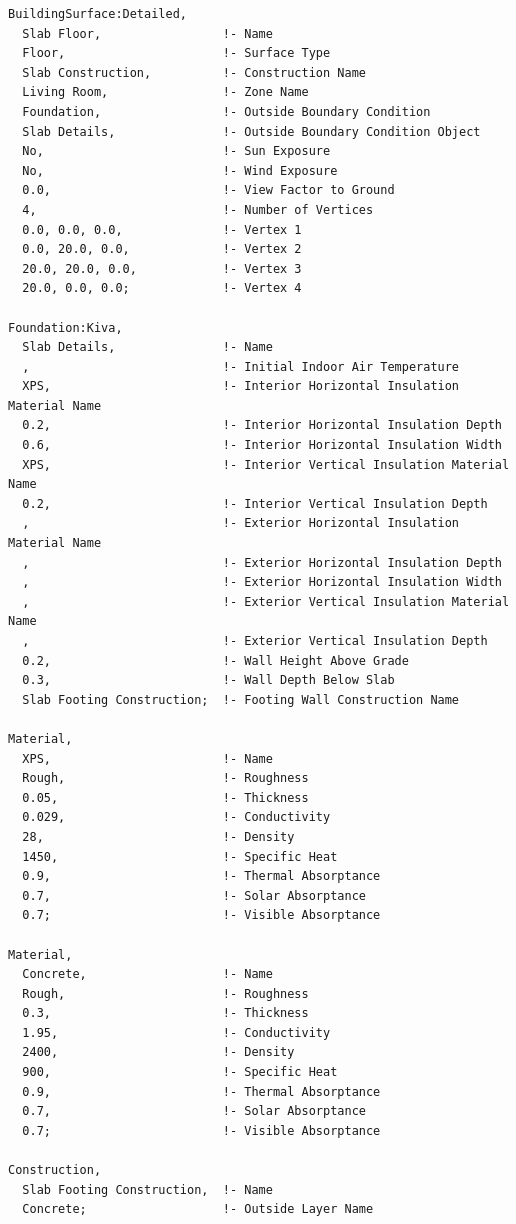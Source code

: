 \begin{lstlisting}
BuildingSurface:Detailed,
  Slab Floor,                 !- Name
  Floor,                      !- Surface Type
  Slab Construction,          !- Construction Name
  Living Room,                !- Zone Name
  Foundation,                 !- Outside Boundary Condition
  Slab Details,               !- Outside Boundary Condition Object
  No,                         !- Sun Exposure
  No,                         !- Wind Exposure
  0.0,                        !- View Factor to Ground
  4,                          !- Number of Vertices
  0.0, 0.0, 0.0,              !- Vertex 1
  0.0, 20.0, 0.0,             !- Vertex 2
  20.0, 20.0, 0.0,            !- Vertex 3
  20.0, 0.0, 0.0;             !- Vertex 4

Foundation:Kiva,
  Slab Details,               !- Name
  ,                           !- Initial Indoor Air Temperature
  XPS,                        !- Interior Horizontal Insulation Material Name
  0.2,                        !- Interior Horizontal Insulation Depth
  0.6,                        !- Interior Horizontal Insulation Width
  XPS,                        !- Interior Vertical Insulation Material Name
  0.2,                        !- Interior Vertical Insulation Depth
  ,                           !- Exterior Horizontal Insulation Material Name
  ,                           !- Exterior Horizontal Insulation Depth
  ,                           !- Exterior Horizontal Insulation Width
  ,                           !- Exterior Vertical Insulation Material Name
  ,                           !- Exterior Vertical Insulation Depth
  0.2,                        !- Wall Height Above Grade
  0.3,                        !- Wall Depth Below Slab
  Slab Footing Construction;  !- Footing Wall Construction Name

Material,
  XPS,                        !- Name
  Rough,                      !- Roughness
  0.05,                       !- Thickness
  0.029,                      !- Conductivity
  28,                         !- Density
  1450,                       !- Specific Heat
  0.9,                        !- Thermal Absorptance
  0.7,                        !- Solar Absorptance
  0.7;                        !- Visible Absorptance

Material,
  Concrete,                   !- Name
  Rough,                      !- Roughness
  0.3,                        !- Thickness
  1.95,                       !- Conductivity
  2400,                       !- Density
  900,                        !- Specific Heat
  0.9,                        !- Thermal Absorptance
  0.7,                        !- Solar Absorptance
  0.7;                        !- Visible Absorptance

Construction,
  Slab Footing Construction,  !- Name
  Concrete;                   !- Outside Layer Name
\end{lstlisting}

